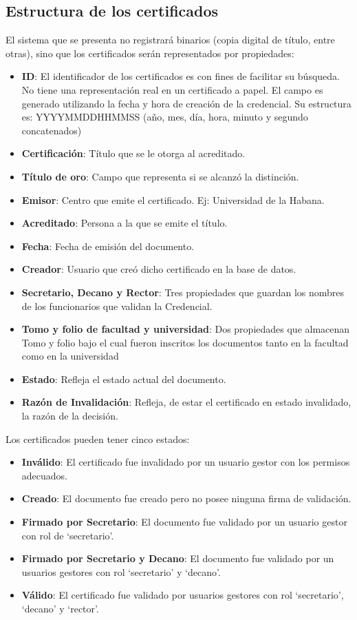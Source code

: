\subsection{Estructura de los certificados}
El sistema que se presenta no registrará binarios (copia digital de título, entre otras), sino que los certificados serán representados por propiedades:
\begin{itemize}
	\item \textbf{ID}: El identificador de los certificados es con fines de facilitar su búsqueda. No tiene una representación real en un certificado a papel. El campo es generado utilizando la fecha y hora de creación de la credencial. Su estructura es: YYYYMMDDHHMMSS (año, mes, día, hora, minuto y segundo concatenados)
	\item \textbf{Certificación}: Título que se le otorga al acreditado.
	\item \textbf{Título de oro}: Campo que representa si se alcanzó la distinción.
	\item \textbf{Emisor}: Centro que emite el certificado. Ej: Universidad de la Habana.
	\item \textbf{Acreditado}: Persona a la que se emite el título.
	\item \textbf{Fecha}: Fecha de emisión del documento.
	\item \textbf{Creador}: Usuario que creó dicho certificado en la base de datos.
	\item \textbf{Secretario, Decano y Rector}: Tres propiedades que guardan los nombres de los funcionarios que validan la Credencial.
	\item \textbf{Tomo y folio de facultad y universidad}: Dos propiedades que almacenan Tomo y folio bajo el cual fueron inscritos los documentos tanto en la facultad como en la universidad
	\item \textbf{Estado}: Refleja el estado actual del documento.
	\item \textbf{Razón de Invalidación}: Refleja, de estar el certificado en estado invalidado, la razón de la decisión.
\end{itemize}

Los certificados pueden tener cinco estados:
\begin{itemize}
	\item \textbf{Inválido}: El certificado fue invalidado por un usuario gestor con los permisos adecuados.
	\item \textbf{Creado}: El documento fue creado pero no posee ninguna firma de validación.
	\item \textbf{Firmado por Secretario}: El documento fue validado por un usuario gestor con rol de `secretario'.
	\item \textbf{Firmado por Secretario y Decano}: El documento fue validado por un usuarios gestores con rol `secretario' y `decano'.
	\item \textbf{Válido}: El certificado fue validado por usuarios gestores con rol `secretario', `decano' y `rector'.
\end{itemize}

